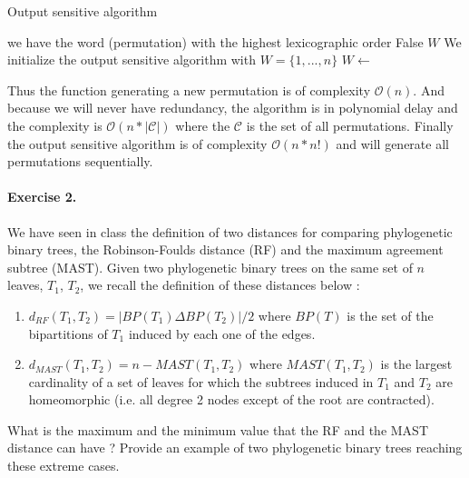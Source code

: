 \documentclass{article}
\begin{document}
\begin{algorithm}
\caption{Output sensitive algorithm}
\begin{algorithmic}[1]
\State we have the word (permutation) with the highest lexicographic order
\State \Return False
\Else
{}
\State \Return $W$
\EndIf
\EndFunction
\State We initialize the output sensitive algorithm with $ W = \{1, ..., n\}$
\State $W \leftarrow$ 
\EndWhile
\end{algorithmic}
\end{algorithm}

\newpage

Thus the function generating a new permutation is of complexity $\mathcal{O} (n)$. And because we will never have redundancy, the algorithm is in polynomial delay and the complexity is $\mathcal{O} (n * |\mathcal{C}|)$ where the $\mathcal{C}$ is the set of all permutations. Finally the output sensitive algorithm is of complexity $\mathcal{O} (n * n!)$ and will generate all permutations sequentially.


\paragraph{Exercise 2. }
We have seen in class the definition of two distances for comparing
phylogenetic binary trees, the Robinson-Foulds distance (RF) and
the maximum agreement subtree (MAST). Given two phylogenetic binary
trees on the same set of $n$ leaves, $T_1$, $T_2$, we recall the definition of these
distances below :
\begin{enumerate}
\item $d_{RF} (T_1, T_2) = | BP(T_1)\Delta BP(T_2) | /2$ where $BP(T)$ is the set of the bipartitions of $T_1$ induced by each one of the edges.
\item $d_{MAST} (T_1, T_2) = n-MAST(T_1, T_2)$ where $MAST(T_1, T_2)$ is the largest cardinality of a set of leaves for which the subtrees induced in $T_1$ and $T_2$ are homeomorphic (i.e. all degree 2 nodes except of the root are contracted).
\end{enumerate}
What is the maximum and the minimum value that the RF and the MAST
distance can have ? Provide an example of two phylogenetic binary trees
reaching these extreme cases.
\\
\end{document}
